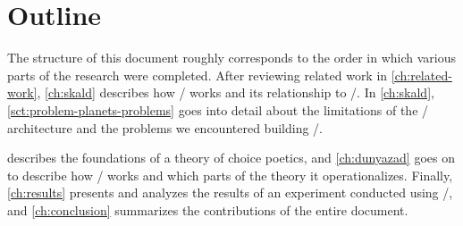 \section{Outline}


The structure of this document roughly corresponds to the order in which various parts of the research were completed.
%
After reviewing related work in \cref{ch:related-work}, \cref{ch:skald} describes how \skald/ works and its relationship to \minstrel/.
%
In \cref{ch:skald}, \cref{sct:problem-planets-problems} goes into detail about the limitations of the \minstrel/ architecture and the problems we encountered building \problemplanets/.


 describes the foundations of a theory of choice poetics, and \cref{ch:dunyazad} goes on to describe how \dunyazad/ works and which parts of the theory it operationalizes.
%
Finally, \cref{ch:results} presents and analyzes the results of an experiment conducted using \dunyazad/, and \cref{ch:conclusion} summarizes the contributions of the entire document.

